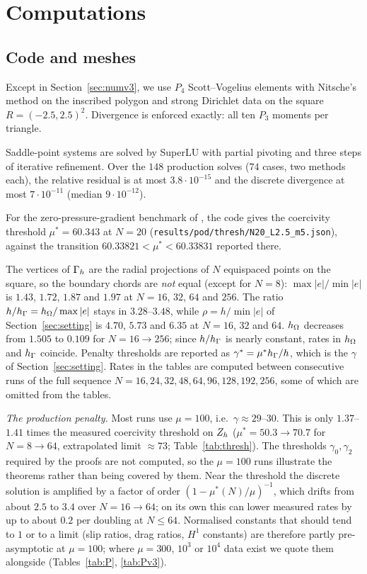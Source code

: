 \section{Computations}\label{sec:numerics}

\subsection{Code and meshes}
Except in Section~\ref{sec:numv3}, we use $P_4$ Scott--Vogelius elements with Nitsche's method on the inscribed polygon and strong Dirichlet data on the square $R=(-2.5,2.5)^2$. Divergence is enforced exactly: all ten $P_3$ moments per triangle.

Saddle-point systems are solved by SuperLU \cite{SuperLU} with partial pivoting and three steps of iterative refinement. Over the $148$ production solves ($74$ cases, two methods each), the relative residual is at most $3.8\cdot10^{-15}$ and the discrete divergence at most $7\cdot10^{-11}$ (median $9\cdot10^{-12}$).

For the zero-pressure-gradient benchmark of \cite{Cavalcante}, the code gives the coercivity threshold $\mu^\ast=60.343$ at $N=20$ (\texttt{results/pod/thresh/}\allowbreak\texttt{N20\_L2.5\_m5.json}), against the transition $60.33821<\mu^\ast<60.33831$ reported there.

The vertices of $\Gamma_h$ are the radial projections of $N$ equispaced points on the square, so the boundary chords are \emph{not} equal (except for $N=8$): $\max|e|/\min|e|$ is $1.43$, $1.72$, $1.87$ and $1.97$ at $N=16$, $32$, $64$ and $256$. The ratio $h/h_\Gamma=h_\Omega/\max|e|$ stays in $3.28$--$3.48$, while $\rho=h/\min|e|$ of Section~\ref{sec:setting} is $4.70$, $5.73$ and $6.35$ at $N=16$, $32$ and $64$. $h_\Omega$ decreases from $1.505$ to $0.109$ for $N=16\to256$; since $h/h_\Gamma$ is nearly constant, rates in $h_\Omega$ and $h_\Gamma$ coincide. Penalty thresholds are reported as $\gamma^\ast=\mu^\ast h_\Gamma/h$, which is the $\gamma$ of Section~\ref{sec:setting}. Rates in the tables are computed between consecutive runs of the full sequence $N=16,24,32,48,64,96,128,192,256$, some of which are omitted from the tables.

\emph{The production penalty.} Most runs use $\mu=100$, i.e.\ $\gamma\approx29$--$30$. This is only $1.37$--$1.41$ times the measured coercivity threshold on $Z_h$ ($\mu^\ast=50.3\to70.7$ for $N=8\to64$, extrapolated limit $\approx73$; Table~\ref{tab:thresh}). The thresholds $\gamma_0,\gamma_2$ required by the proofs are not computed, so the $\mu=100$ runs illustrate the theorems rather than being covered by them. Near the threshold the discrete solution is amplified by a factor of order $(1-\mu^\ast(N)/\mu)^{-1}$, which drifts from about $2.5$ to $3.4$ over $N=16\to64$; on its own this can lower measured rates by up to about $0.2$ per doubling at $N\le64$. Normalised constants that should tend to $1$ or to a limit (slip ratios, drag ratios, $H^1$ constants) are therefore partly pre-asymptotic at $\mu=100$; where $\mu=300$, $10^3$ or $10^4$ data exist we quote them alongside (Tables~\ref{tab:P}, \ref{tab:Pv3}).

